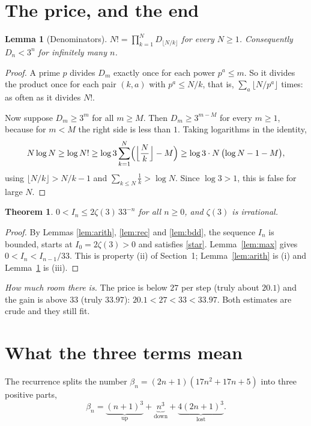\documentclass[11pt]{article}
\newtheorem{theorem}{Theorem}
\newtheorem{lemma}{Lemma}
\begin{document}
\section{The price, and the end}

\begin{lemma}[Denominators]\label{lem:lcm}
$N!=\prod_{k=1}^{N}D_{\lfloor N/k\rfloor}$ for every $N\ge1$. Consequently $D_n<3^n$ for infinitely
many $n$.
\end{lemma}
\begin{proof}
A prime $p$ divides $D_m$ exactly once for each power $p^a\le m$. So it divides the product once for
each pair $(k,a)$ with $p^a\le N/k$, that is, $\sum_a\lfloor N/p^a\rfloor$ times: as often as it
divides $N!$.

Now suppose $D_m\ge3^m$ for all $m\ge M$. Then $D_m\ge3^{m-M}$ for every $m\ge1$, because for $m<M$
the right side is less than $1$. Taking logarithms in the identity,
\[
N\log N\ge\log N!\ge\log3\sum_{k=1}^N\Bigl(\Bigl\lfloor\frac Nk\Bigr\rfloor-M\Bigr)
\ge\log3\cdot N\,\bigl(\log N-1-M\bigr),
\]
using $\lfloor N/k\rfloor>N/k-1$ and $\sum_{k\le N}\frac1k>\log N$. Since $\log3>1$, this is false
for large $N$.
\end{proof}

\begin{theorem}
$0<I_n\le2\zeta(3)\,33^{-n}$ for all $n\ge0$, and $\zeta(3)$ is irrational.
\end{theorem}
\begin{proof}
By Lemmas \ref{lem:arith}, \ref{lem:rec} and \ref{lem:bdd}, the sequence $I_n$ is bounded, starts
at $I_0=2\zeta(3)>0$ and satisfies \eqref{star}. Lemma~\ref{lem:max} gives $0<I_n<I_{n-1}/33$. This
is property (ii) of Section~1; Lemma~\ref{lem:arith} is (i) and Lemma~\ref{lem:lcm} is (iii).
\end{proof}

\noindent\emph{How much room there is.} The price is below $27$ per step (truly about $20.1$) and
the gain is above $33$ (truly $33.97$): $20.1<27<33<33.97$. Both estimates are crude and they still
fit.

\section{What the three terms mean}

The recurrence splits the number $\beta_n=(2n+1)(17n^2+17n+5)$ into three positive parts,
\[
\beta_n=\underbrace{(n+1)^3}_{\text{up}}+\underbrace{n^3}_{\text{down}}+\underbrace{4(2n+1)^3}_{\text{lost}} .
\]
\end{document}
